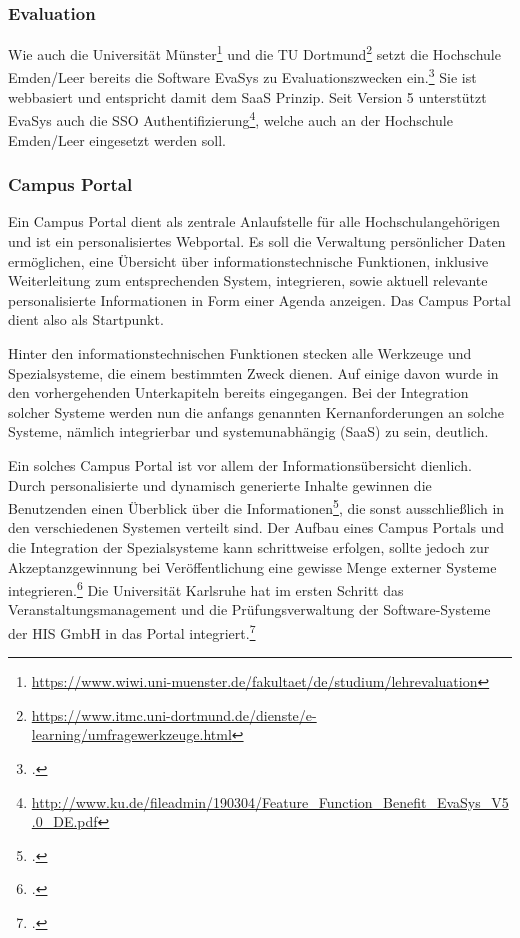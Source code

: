 \subsubsection{Evaluation}
Wie auch die Universität Münster\footnote{\url{https://www.wiwi.uni-muenster.de/fakultaet/de/studium/lehrevaluation}} und die TU Dortmund\footnote{\url{https://www.itmc.uni-dortmund.de/dienste/e-learning/umfragewerkzeuge.html}} setzt die Hochschule Emden/Leer bereits die Software EvaSys zu Evaluationszwecken ein.\footcite{gunter_muller_interview} Sie ist webbasiert und entspricht damit dem SaaS Prinzip.
Seit Version 5 unterstützt EvaSys auch die SSO Authentifizierung\footnote{\url{http://www.ku.de/fileadmin/190304/Feature_Function_Benefit_EvaSys_V5.0_DE.pdf}}, welche auch an der Hochschule Emden/Leer eingesetzt werden soll.

\subsubsection{Campus Portal}
\label{subsubsection_campus_portal}
Ein Campus Portal dient als zentrale Anlaufstelle für alle Hochschulangehörigen und ist ein personalisiertes Webportal. Es soll die Verwaltung persönlicher Daten ermöglichen, eine Übersicht über informationstechnische Funktionen, inklusive Weiterleitung zum entsprechenden System, integrieren, sowie aktuell relevante personalisierte Informationen in Form einer Agenda anzeigen. Das Campus Portal dient also als Startpunkt.

Hinter den informationstechnischen Funktionen stecken alle Werkzeuge und Spezialsysteme, die einem bestimmten Zweck dienen. Auf einige davon wurde in den vorhergehenden Unterkapiteln bereits eingegangen. Bei der Integration solcher Systeme werden nun die anfangs genannten Kernanforderungen an solche Systeme, nämlich integrierbar und systemunabhängig (SaaS) zu sein, deutlich.

Ein solches Campus Portal ist vor allem der Informationsübersicht dienlich. Durch personalisierte und dynamisch generierte Inhalte gewinnen die Benutzenden einen Überblick über die Informationen\footcite[Vgl.][24]{dini_webportale_2007}, die sonst ausschließlich in den verschiedenen Systemen verteilt sind. Der Aufbau eines Campus Portals und die Integration der Spezialsysteme kann schrittweise erfolgen, sollte jedoch zur Akzeptanzgewinnung bei Veröffentlichung eine gewisse Menge externer Systeme integrieren.\footcite[Vgl.][17 f.]{dini_webportale_2007} Die Universität Karlsruhe hat im ersten Schritt das Veranstaltungsmanagement und die Prüfungsverwaltung der Software-Systeme der HIS GmbH in das Portal integriert.\footcite[Vgl.][40 f.]{dini_webportale_2007}

